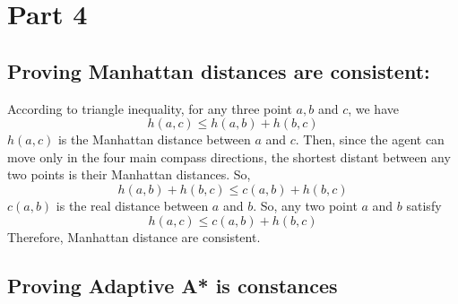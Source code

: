 \documentclass[11pt]{article}
\begin{document}

\section*{Part 4}




\subsection*{Proving Manhattan distances are consistent:}

According to triangle inequality, for any three point $a, b$ and $c$, we have
	$$h(a, c) \leq h(a, b) + h(b, c)$$
$h(a, c)$ is the Manhattan distance between $a$ and $c$.
\newline
Then, since the agent can move only in the four main compass directions, the shortest distant between any two points is their Manhattan distances. So,
	$$h(a, b) + h(b, c)\leq c(a, b) + h(b, c)$$
$c(a, b)$ is the real distance between $a$ and $b$. So, any two point $a$ and $b$ satisfy
	$$h(a, c) \leq c(a, b) + h(b, c)$$
Therefore, Manhattan distance are consistent.

\subsection*{Proving Adaptive A* is constances}
\end{document}
